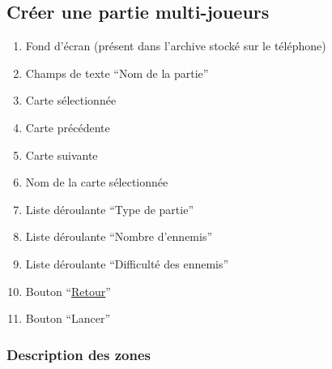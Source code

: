 \documentclass{report}
\begin{document}
	\subsection{Créer une partie multi-joueurs}
	
		\hypertarget{Creer partie multi-joueurs}{}
		\label{Creer partie multi-joueurs}
	
		\begin{center}
			
		\end{center}
		
		\begin{enumerate}
		  \item Fond d'écran (présent dans l'archive stocké sur le téléphone)
		  \item Champs de texte ``Nom de la partie''
		  \item Carte sélectionnée
		  \item Carte précédente
		  \item Carte suivante
		  \item Nom de la carte sélectionnée
		  \item Liste déroulante ``Type de partie''
		  \item Liste déroulante ``Nombre d'ennemis''
		  \item Liste déroulante ``Difficulté des ennemis''
		  \item Bouton ``\hyperlink{Page d'accueil}{Retour}''
		  \item Bouton ``Lancer'' 
		\end{enumerate}

		\subsubsection{Description des zones}
		
\end{document}
